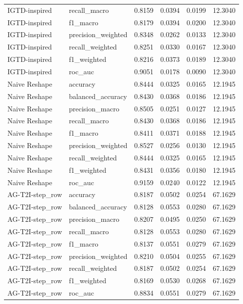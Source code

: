 \begin{tabular}{llrrrr}
IGTD-inspired & recall_macro & 0.8159 & 0.0394 & 0.0199 & 12.3040 \\
IGTD-inspired & f1_macro & 0.8179 & 0.0394 & 0.0200 & 12.3040 \\
IGTD-inspired & precision_weighted & 0.8348 & 0.0262 & 0.0133 & 12.3040 \\
IGTD-inspired & recall_weighted & 0.8251 & 0.0330 & 0.0167 & 12.3040 \\
IGTD-inspired & f1_weighted & 0.8216 & 0.0373 & 0.0189 & 12.3040 \\
IGTD-inspired & roc_auc & 0.9051 & 0.0178 & 0.0090 & 12.3040 \\
Naive Reshape & accuracy & 0.8444 & 0.0325 & 0.0165 & 12.1945 \\
Naive Reshape & balanced_accuracy & 0.8430 & 0.0368 & 0.0186 & 12.1945 \\
Naive Reshape & precision_macro & 0.8505 & 0.0251 & 0.0127 & 12.1945 \\
Naive Reshape & recall_macro & 0.8430 & 0.0368 & 0.0186 & 12.1945 \\
Naive Reshape & f1_macro & 0.8411 & 0.0371 & 0.0188 & 12.1945 \\
Naive Reshape & precision_weighted & 0.8527 & 0.0256 & 0.0130 & 12.1945 \\
Naive Reshape & recall_weighted & 0.8444 & 0.0325 & 0.0165 & 12.1945 \\
Naive Reshape & f1_weighted & 0.8431 & 0.0356 & 0.0180 & 12.1945 \\
Naive Reshape & roc_auc & 0.9159 & 0.0240 & 0.0122 & 12.1945 \\
AG-T2I-step_row & accuracy & 0.8187 & 0.0502 & 0.0254 & 67.1629 \\
AG-T2I-step_row & balanced_accuracy & 0.8128 & 0.0553 & 0.0280 & 67.1629 \\
AG-T2I-step_row & precision_macro & 0.8207 & 0.0495 & 0.0250 & 67.1629 \\
AG-T2I-step_row & recall_macro & 0.8128 & 0.0553 & 0.0280 & 67.1629 \\
AG-T2I-step_row & f1_macro & 0.8137 & 0.0551 & 0.0279 & 67.1629 \\
AG-T2I-step_row & precision_weighted & 0.8210 & 0.0504 & 0.0255 & 67.1629 \\
AG-T2I-step_row & recall_weighted & 0.8187 & 0.0502 & 0.0254 & 67.1629 \\
AG-T2I-step_row & f1_weighted & 0.8169 & 0.0530 & 0.0268 & 67.1629 \\
AG-T2I-step_row & roc_auc & 0.8834 & 0.0551 & 0.0279 & 67.1629 \\

\end{tabular}

